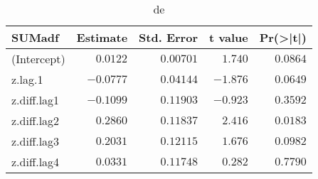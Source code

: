 \begin{table}[!tbp]
\caption{de\label{SUMadf}} 
{\centering
\begin{tabular}{lrrrr}
\hline\hline
\multicolumn{1}{l}{SUMadf}&\multicolumn{1}{c}{Estimate}&\multicolumn{1}{c}{Std. Error}&\multicolumn{1}{c}{t value}&\multicolumn{1}{c}{Pr(\textgreater |t|)}\tabularnewline
\hline
(Intercept)&$ 0.0122$&$0.00701$&$ 1.740$&$0.0864$\tabularnewline
z.lag.1&$-0.0777$&$0.04144$&$-1.876$&$0.0649$\tabularnewline
z.diff.lag1&$-0.1099$&$0.11903$&$-0.923$&$0.3592$\tabularnewline
z.diff.lag2&$ 0.2860$&$0.11837$&$ 2.416$&$0.0183$\tabularnewline
z.diff.lag3&$ 0.2031$&$0.12115$&$ 1.676$&$0.0982$\tabularnewline
z.diff.lag4&$ 0.0331$&$0.11748$&$ 0.282$&$0.7790$\tabularnewline
\hline
\end{tabular}}

\end{table}

